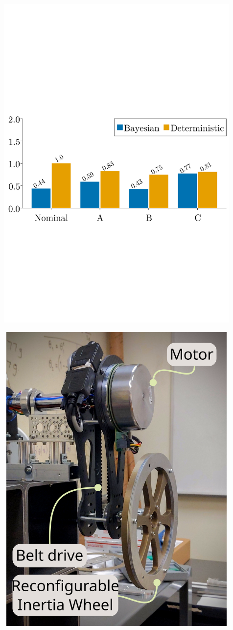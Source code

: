 \documentclass[
]{report}
\begin{document}
\includegraphics[width=7.8125in,height=6.77083in]{contents/assets/pbc_bar.svg}

\includegraphics[width=6.77083in,height=6.25in]{contents/assets/hardware.svg}
\end{document}
